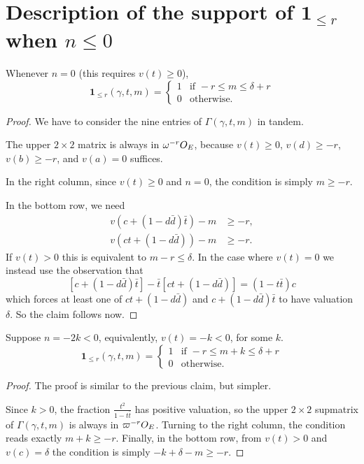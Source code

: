 \section{Description of the support of $\mathbf{1}_{\le r}$ when $n \le 0$}
\begin{proposition}
  Whenever $n = 0$ (this requires $v(t) \geq 0$),
  \[
    \mathbf{1}_{\le r}(\gamma, t, m) =
    \begin{cases}
      1 & \text{if } -r \le m \le \delta+r \\
      0 & \text{otherwise.}
    \end{cases}
  \]
\end{proposition}
\begin{proof}
  We have to consider the nine entries of $\Gamma(\gamma, t, m)$ in tandem.

  The upper $2 \times 2$ matrix is always in $\omega^{-r}O_E$,
  because $v(t) \geq 0$, $v(d) \geq -r$, $v(b) \geq -r$, and $v(a) = 0$ suffices.

  In the right column, since $v(t) \geq 0$ and $n = 0$, the condition is simply $m \ge -r$.

  In the bottom row, we need
  \begin{align*}
    v\left( c+(1-d\bar d) \bar t \right)-m &\geq -r, \\
    v\left( ct +(1-d\bar d) \right)-m &\geq -r.
  \end{align*}
  If $v(t) > 0$ this is equivalent to $m-r \leq \delta$.
  In the case where $v(t) = 0$ we instead use the observation that
  \begin{equation}
    \left[ c + (1-d \bar d) \bar t \right]
    - \bar t \left[ ct + (1-d \bar d) \right] = (1-t\bar t) c
    \label{eq:ctrick}
  \end{equation}
  which forces at least one of $ct + (1-d \bar d)$ and $c + (1-d \bar d) \bar t$ to
  have valuation $\delta$. So the claim follows now.
\end{proof}

\begin{proposition}
  Suppose $n = -2k < 0$, equivalently, $v(t) = -k < 0$, for some $k$.
  \[
    \mathbf{1}_{\le r}(\gamma, t, m) =
    \begin{cases}
      1 & \text{if } -r \le m+k \le \delta+r \\
      0 & \text{otherwise.}
    \end{cases}
  \]
\end{proposition}
\begin{proof}
  The proof is similar to the previous claim, but simpler.

  Since $k > 0$, the fraction $\frac{t^2}{1-t \bar t}$ has positive valuation,
  so the upper $2 \times 2$ supmatrix of $\Gamma(\gamma, t, m)$ is always in $\varpi^{-r}O_E$.
  Turning to the right column, the condition reads exactly $m+k \geq -r$.
  Finally, in the bottom row, from $v(t) > 0$ and $v(c) = \delta$
  the condition is simply $-k+\delta-m \geq -r$.
\end{proof}

